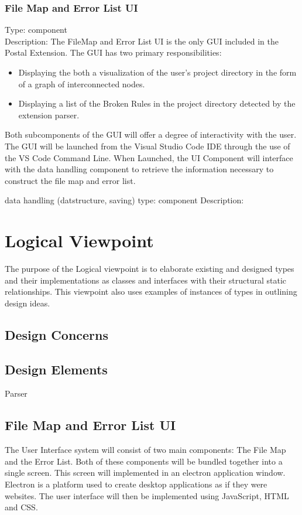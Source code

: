 \documentclass[letterpaper,10pt,titlepage,draftclsnofoot,onecolumn,onesided] {IEEEtran}
\begin{document}
	\subsubsection{File Map and Error List UI}
	Type: component
	\\
	Description: The FileMap and Error List UI is the only GUI included in the Postal Extension. 
	The GUI has two primary responsibilities: 
	\begin{itemize}
	\item Displaying the both a visualization of the user's project directory in the form of a graph of interconnected nodes.
	\item Displaying a list of the Broken Rules in the project directory detected by the extension parser.
	\end{itemize}
	Both subcomponents of the GUI will offer a degree of interactivity with the user. 
	The GUI will be launched from the Visual Studio Code IDE through the use of the VS Code Command Line.
	When Launched, the UI Component will interface with the data handling component to retrieve the information necessary to construct the file map and error list.

	
	data handling (datstructure, saving)
	type: component
	Description:
	
	
\section{Logical Viewpoint}
The purpose of the Logical viewpoint is to elaborate existing and designed types and their implementations
as classes and interfaces with their structural static relationships. This viewpoint also uses examples of
instances of types in outlining design ideas. 
\subsection{Design Concerns}
\subsection{Design Elements}
	Parser

	\subsection{File Map and Error List UI}
	The User Interface system will consist of two main components: The File Map and the Error List. 
	Both of these components will be bundled together into a single screen. 
	This screen will implemented in an electron application window. 
	Electron is a platform used to create desktop applications as if they were websites.
	The user interface will then be implemented using JavaScript, HTML and CSS.
\end{document}
